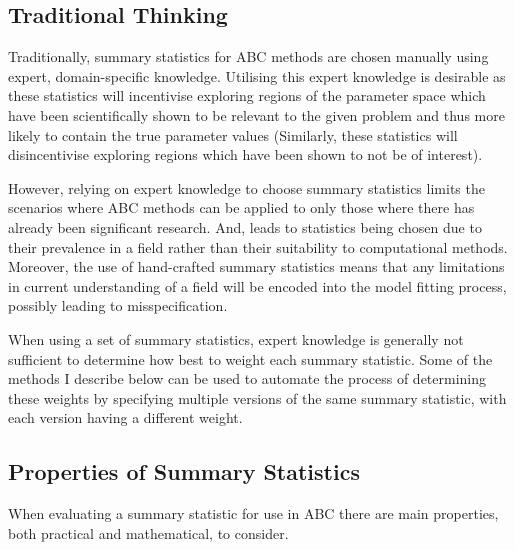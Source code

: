 \documentclass[11pt,a4paper]{article}
\theoremstyle{break}
\begin{document}
  \subsection*{Traditional Thinking}\label{sec_summary_stats_traditional_thinking}

  \par Traditionally, summary statistics for ABC methods are chosen manually using expert, domain-specific knowledge. Utilising this expert knowledge is desirable as these statistics will incentivise exploring regions of the parameter space which have been scientifically shown to be relevant to the given problem and thus more likely to contain the true parameter values (Similarly, these statistics will disincentivise exploring regions which have been shown to not be of interest). %


  \par However, relying on expert knowledge to choose summary statistics limits the scenarios where ABC methods can be applied to only those where there has already been significant research. And, leads to statistics being chosen due to their prevalence in a field rather than their suitability to computational methods. Moreover, the use of hand-crafted summary statistics means that any limitations in current understanding of a field will be encoded into the model fitting process, possibly leading to misspecification.

  \par When using a set of summary statistics, expert knowledge is generally not sufficient to determine how best to weight each summary statistic. Some of the methods I describe below can be used to automate the process of determining these weights by specifying multiple versions of the same summary statistic, with each version having a different weight. %

\subsection{Properties of Summary Statistics}\label{sec_properties_of_summary_statistics}

  \par When evaluating a summary statistic for use in ABC there are main properties, both practical and mathematical, to consider.
\end{document}
